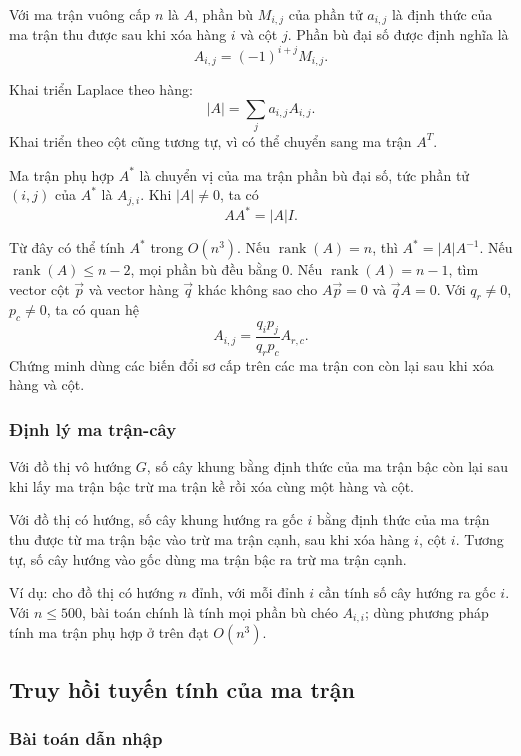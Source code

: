 \documentclass[11pt]{article}
\begin{document}
Với ma trận vuông cấp \(n\) là \(A\), phần bù \(M_{i,j}\) của phần tử
\(a_{i,j}\) là định thức của ma trận thu được sau khi xóa hàng \(i\) và cột
\(j\). Phần bù đại số được định nghĩa là
\[
  A_{i,j}=(-1)^{i+j}M_{i,j}.
\]

Khai triển Laplace theo hàng:
\[
  |A|=\sum_j a_{i,j}A_{i,j}.
\]
Khai triển theo cột cũng tương tự, vì có thể chuyển sang ma trận \(A^T\).

Ma trận phụ hợp \(A^*\) là chuyển vị của ma trận phần bù đại số, tức phần tử
\((i,j)\) của \(A^*\) là \(A_{j,i}\). Khi \(|A|\ne 0\), ta có
\[
  AA^*=|A|I.
\]

Từ đây có thể tính \(A^*\) trong \(O(n^3)\). Nếu \(\operatorname{rank}(A)=n\),
thì \(A^*=|A|A^{-1}\). Nếu \(\operatorname{rank}(A)\le n-2\), mọi phần bù đều
bằng \(0\). Nếu \(\operatorname{rank}(A)=n-1\), tìm vector cột \(\vec p\) và
vector hàng \(\vec q\) khác không sao cho \(A\vec p=0\) và \(\vec qA=0\). Với
\(q_r\ne 0\), \(p_c\ne 0\), ta có quan hệ
\[
  A_{i,j}=\frac{q_i p_j}{q_r p_c}A_{r,c}.
\]
Chứng minh dùng các biến đổi sơ cấp trên các ma trận con còn lại sau khi xóa
hàng và cột.

\subsubsection{Định lý ma trận-cây}

Với đồ thị vô hướng \(G\), số cây khung bằng định thức của ma trận bậc còn lại
sau khi lấy ma trận bậc trừ ma trận kề rồi xóa cùng một hàng và cột.

Với đồ thị có hướng, số cây khung hướng ra gốc \(i\) bằng định thức của ma trận
thu được từ ma trận bậc vào trừ ma trận cạnh, sau khi xóa hàng \(i\), cột
\(i\). Tương tự, số cây hướng vào gốc dùng ma trận bậc ra trừ ma trận cạnh.

Ví dụ: cho đồ thị có hướng \(n\) đỉnh, với mỗi đỉnh \(i\) cần tính số cây hướng
ra gốc \(i\). Với \(n\le 500\), bài toán chính là tính mọi phần bù chéo
\(A_{i,i}\); dùng phương pháp tính ma trận phụ hợp ở trên đạt \(O(n^3)\).

\subsection{Truy hồi tuyến tính của ma trận}

\subsubsection{Bài toán dẫn nhập}
\end{document}
